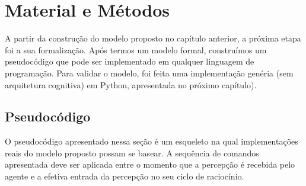 \chapter{Material e Métodos}

A partir da construção do modelo proposto no capítulo anterior, a próxima etapa foi a sua formalização. Após termos um modelo formal, construímos um pseudocódigo que pode ser implementado em qualquer linguagem de programação. Para validar o modelo, foi feita uma implementação genéria (sem arquitetura cognitiva) em Python, apresentada no próximo capítulo).



\section{Pseudocódigo}

O pseudocódigo apresentado nessa seção é um esqueleto na qual implementações reais do modelo proposto possam se basear. A sequência de comandos apresentada deve ser aplicada entre o momento que a percepção é recebida pelo agente e a efetiva entrada da percepção no seu ciclo de raciocínio.

